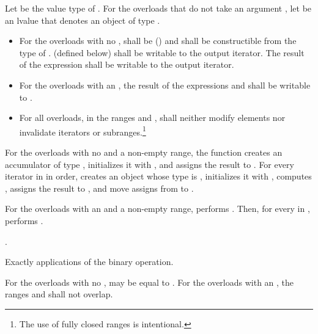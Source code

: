 \begin{itemdescr}
\pnum
Let  be the value type of .
For the overloads that do not take an argument ,
let  be an lvalue
that denotes an object of type .

\pnum
\requires
\begin{itemize}
\item
For the overloads with no ,
 shall be  () and shall
be constructible from the type of .  (defined below)
shall be writable to the 
output iterator.  The result of the expression
 shall be writable to the  output iterator.

\item
For the overloads with an ,
the result of the expressions  and
 shall be writable to .

\item
For all overloads, in the ranges
and
,
shall neither modify elements nor invalidate iterators or
subranges.\footnote{The use of fully closed ranges is intentional.}
\end{itemize}

\pnum
\effects For the overloads with no  and a non-empty range,
the function creates an accumulator  of type ,
initializes it with ,
and assigns the result to . For every iterator  in 
in order, creates an object  whose type is , initializes it
with , computes , assigns the result
to , and move assigns from  to .

\pnum
For the overloads with an  and a non-empty range,
performs .
Then, for every  in ,
performs .

\pnum
\returns
{}.

\pnum
\complexity
Exactly
applications of
the binary operation.

\pnum
\remarks
For the overloads with no ,  may be equal
to .  For the overloads with an , the ranges
 and  shall not overlap.
\end{itemdescr}

